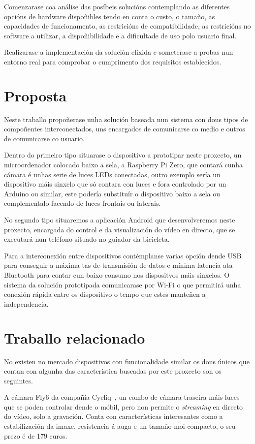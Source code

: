 Comenzarase coa análise das posíbeis solucións contemplando as diferentes opcións de hardware dispoñibles tendo en conta o custo, o tamaño, as capacidades de funcionamento, as restricións de compatibilidade, as restricións no software a utilizar, a dispoñibilidade e a dificultade de uso polo usuario final.

Realizarase a implementación da solución elixida e someterase a probas nun entorno real para comprobar o cumprimento dos requisitos establecidos.


\section{Proposta}
Neste traballo propoñerase unha solución baseada nun sistema con dous tipos de compoñentes interconectados, uns encargados de comunicarse co medio e outros de comunicarse co usuario.

 Dentro do primeiro tipo situarase o dispositivo a prototipar neste proxecto, un microordenador colocado baixo a sela, a Raspberry Pi Zero, que contará cunha cámara é unhas serie de luces LEDs conectadas, outro exemplo sería un dispositivo máis sinxelo que só contara con luces e fora controlado por un Arduino ou similar, este podería substituír o dispositivo baixo a sela ou complementalo facendo de luces frontais ou laterais.

 No segundo tipo situaremos a aplicación Android que desenvolveremos neste proxecto, encargada do control e da visualización do vídeo en directo, que se executará nun teléfono situado no guiador da bicicleta.

Para a interconexión entre dispositivos contémplanse varias opción dende USB para conseguir a máxima tas de transmisión de datos e mínima latencia ata Bluetooth para contar cun baixo consumo nos dispositvos máis sinxelos. O sistema da solución prototipada comunicarase por Wi-Fi o que permitirá unha conexión rápida entre os dispositivo o tempo que estes manteñen a independencia.

\section{Traballo relacionado}
No existen no mercado dispositivos con funcionalidade similar os dous únicos que contan con algunha das característica buscadas por este proxecto son os seguintes.

 A cámara Fly6 da compañía Cycliq~\cite{Fly6CERear}, un combo de cámara traseira máis luces que se poden controlar dende o móbil, pero non permite o \emph{streaming} en directo do vídeo, solo a gravación. Conta con características interesantes como a estabilización da imaxe, resistencia á auga e un tamaño moi compacto, o seu prezo é de 179 euros.

